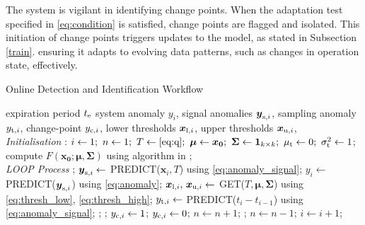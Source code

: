 The system is vigilant in identifying change points. When the adaptation test specified in \eqref{eq:condition} is satisfied, change points are flagged and isolated. This initiation of change points triggers updates to the model, as stated in Subsection \ref{train}. ensuring it adapts to evolving data patterns, such as changes in operation state, effectively.

\begin{algorithm}[H]
  \caption{{Online Detection and Identification Workflow}} \label{alg:detector}
  \begin{algorithmic}[1]
    \renewcommand{\algorithmicrequire}{\textbf{Input:}}
    \renewcommand{\algorithmicensure}{\textbf{Output:}}
    \REQUIRE expiration period $t _{\text{e}}$
    \ENSURE system anomaly $y_i$, signal anomalies $\boldsymbol{y} _{\text{s}, i}$, sampling anomaly $y _{\text{t}, i}$, change-point $y _{\text{c}, i}$, lower thresholds $\boldsymbol{x} _{\text{l}, i}$, upper thresholds $\boldsymbol{x} _{\text{u}, i}$,
    \\ \textit{Initialisation} :
    \STATE $i \leftarrow 1;~ n \leftarrow 1;~ T \leftarrow \eqref{eq:q};~ \boldsymbol{\mu} \leftarrow \boldsymbol{x_0};~ \boldsymbol{\Sigma} \leftarrow \mathbf{1}_{k \times k};~ \mu _{\text{t}} \leftarrow 0;~ \sigma _{\text{t}}^2 \leftarrow 1$;
    \STATE compute $F(\boldsymbol{x_0}; \boldsymbol{\mu}, \boldsymbol{\Sigma})$ using algorithm in \citet{Genz2000};
    \\ \textit{LOOP Process}
    \LOOP
    ;
    \STATE $\boldsymbol{y} _{\text{s}, i} \leftarrow$ PREDICT($\boldsymbol{x}_i, T$) using \eqref{eq:anomaly_signal};
    \STATE $y_i \leftarrow$ PREDICT($\boldsymbol{y} _{\text{s}, i}$) using \eqref{eq:anomaly};
    \STATE $\boldsymbol{x} _{\text{l}, i}\text{, }\boldsymbol{x} _{\text{u}, i} \leftarrow$ GET($T, \boldsymbol{\mu}, \boldsymbol{\Sigma}$) using \eqref{eq:thresh_low}, \eqref{eq:thresh_high};
    \STATE $y _{\text{t}, i} \leftarrow$ PREDICT($t_i - t_{i-1}$) using \eqref{eq:anomaly_signal};
    ;
    \IF {\eqref{eq:anomaly} = 0 \OR \eqref{eq:condition}}
    ;
    \IF {\eqref{eq:condition}}
    \STATE $y _{\text{c}, i} \leftarrow 1$;
    \ELSE
    \STATE $y _{\text{c}, i} \leftarrow 0$;
    \ENDIF
    \STATE $n \leftarrow n + 1$;
    ;
    \STATE $n \leftarrow n - 1$;
    \ENDFOR
    \ENDIF
    \STATE $i \leftarrow i + 1$;
    \ENDLOOP
  \end{algorithmic}
\end{algorithm}
